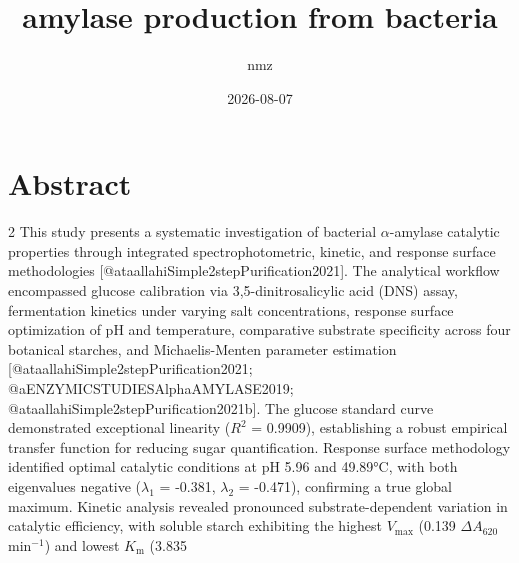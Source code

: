 \documentclass[
  12pt,
]{article}
\title{amylase production from bacteria}
\author{nmz}
\date{2026-08-07}
\begin{document}
\maketitle

{
\setcounter{tocdepth}{3}
\tableofcontents
}
\section{Abstract}\label{abstract}

\begin{multicols}{2}
This study presents a systematic investigation of bacterial $\alpha$-amylase catalytic properties through integrated spectrophotometric, kinetic, and response surface methodologies [@ataallahiSimple2stepPurification2021]. The analytical workflow encompassed glucose calibration via 3,5-dinitrosalicylic acid (DNS) assay, fermentation kinetics under varying salt concentrations, response surface optimization of pH and temperature, comparative substrate specificity across four botanical starches, and Michaelis-Menten parameter estimation [@ataallahiSimple2stepPurification2021; @aENZYMICSTUDIESAlphaAMYLASE2019; @ataallahiSimple2stepPurification2021b]. The glucose standard curve demonstrated exceptional linearity ($R^2$ = 0.9909), establishing a robust empirical transfer function for reducing sugar quantification. Response surface methodology identified optimal catalytic conditions at pH 5.96 and 49.89°C, with both eigenvalues negative ($\lambda_1$ = -0.381, $\lambda_2$ = -0.471), confirming a true global maximum. Kinetic analysis revealed pronounced substrate-dependent variation in catalytic efficiency, with soluble starch exhibiting the highest $V_\text{max}$ (0.139 $\Delta A_{620}$ min$^{-1}$) and lowest $K_\text{m}$ (3.835%

\end{multicols}
\end{document}
